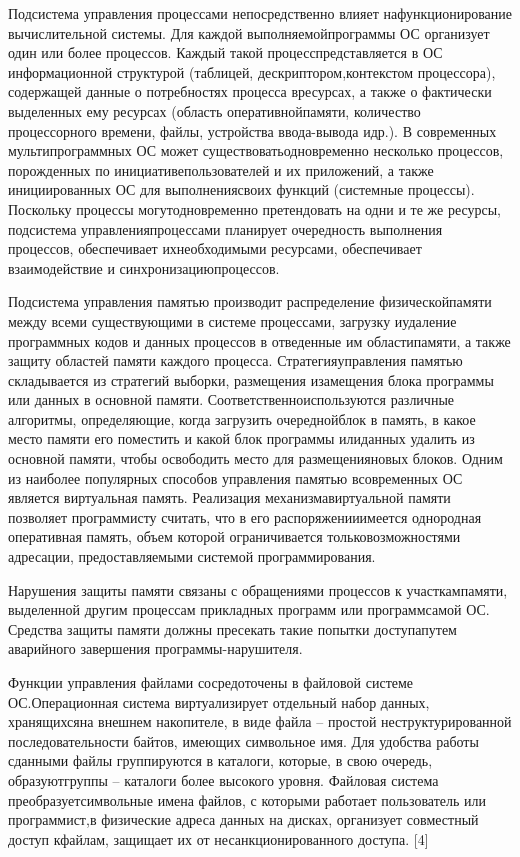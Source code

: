 Подсистема   управления   процессами   непосредственно   влияет   нафункционирование   вычислительной   системы.   Для   каждой   выполняемойпрограммы ОС организует один или более процессов. Каждый такой процесспредставляется в ОС информационной структурой (таблицей, дескриптором,контекстом   процессора),   содержащей   данные   о   потребностях   процесса   вресурсах, а также о фактически выделенных ему ресурсах (область оперативнойпамяти, количество процессорного времени, файлы, устройства ввода-вывода идр.).   В   современных   мультипрограммных   ОС   может   существоватьодновременно   несколько   процессов,   порожденных   по   инициативепользователей и их приложений, а также инициированных ОС для выполнениясвоих   функций   (системные   процессы).   Поскольку   процессы   могутодновременно претендовать на одни и те же ресурсы, подсистема управленияпроцессами планирует очередность выполнения процессов, обеспечивает ихнеобходимыми   ресурсами,   обеспечивает   взаимодействие   и   синхронизациюпроцессов.~\cite{Oc2}

Подсистема управления памятью производит распределение физическойпамяти   между   всеми   существующими   в   системе   процессами,   загрузку   иудаление программных кодов и данных процессов в отведенные им областипамяти,   а   также   защиту   областей   памяти   каждого   процесса.   Стратегияуправления   памятью   складывается   из   стратегий   выборки,   размещения   изамещения блока программы или данных в основной памяти. Соответственноиспользуются различные алгоритмы, определяющие, когда загрузить очереднойблок в память, в какое место памяти его поместить и какой блок программы илиданных удалить из основной памяти, чтобы освободить место для размещенияновых блоков. Одним из наиболее популярных способов управления памятью всовременных   ОС   является   виртуальная   память.   Реализация   механизмавиртуальной памяти позволяет программисту считать, что в его распоряженииимеется однородная оперативная память, объем которой ограничивается тольковозможностями адресации, предоставляемыми системой программирования.

Нарушения защиты памяти связаны с обращениями процессов к участкампамяти, выделенной другим процессам прикладных программ или программсамой ОС. Средства защиты памяти должны пресекать такие попытки доступапутем аварийного завершения программы-нарушителя.

Функции управления файлами сосредоточены в файловой системе ОС.Операционная система виртуализирует отдельный набор данных, хранящихсяна   внешнем   накопителе,   в   виде   файла   –   простой   неструктурированной последовательности байтов, имеющих символьное имя. Для удобства работы сданными файлы группируются в каталоги, которые, в свою очередь, образуютгруппы – каталоги более высокого уровня. Файловая система преобразуетсимвольные имена файлов, с которыми работает пользователь или программист,в физические адреса данных на дисках, организует совместный доступ кфайлам, защищает их от несанкционированного доступа.  [4]

